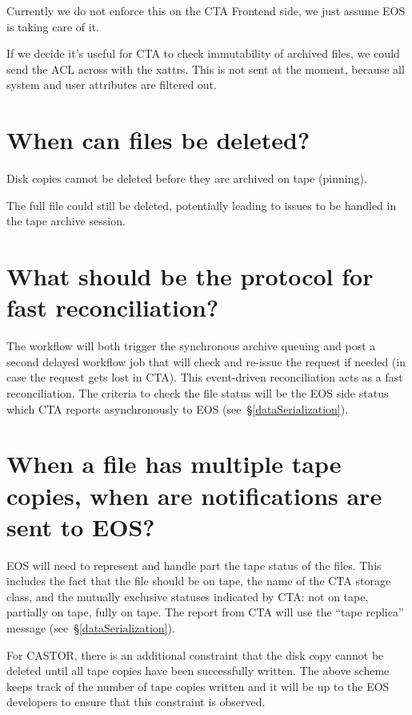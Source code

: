 Currently we do not enforce this on the CTA Frontend side, we just assume EOS is taking care of it.

If we decide it's useful for CTA to check immutability of archived files, we could send the ACL across with the xattrs.
This is not sent at the moment, because all system and user attributes are filtered out.

\section{When can files be deleted?}

Disk copies cannot be deleted before they are archived on tape (pinning).

The full file could still be deleted, potentially leading to issues to be handled in the tape archive session.

\section{What should be the protocol for fast reconciliation?}

The workflow will both trigger the synchronous archive queuing and post a second delayed workflow job that will
check and re-issue the request if needed (in case the request gets lost in CTA). This event-driven reconciliation acts
as a fast reconciliation. The criteria to check the file status will be the EOS side status which CTA reports
asynchronously to EOS (see~\S\ref{dataSerialization}).

\section{When a file has multiple tape copies, when are notifications are sent to EOS?}

EOS will need to represent and handle part the tape status of the files. This includes the fact that the file should be
on tape, the name of the CTA storage class, and the mutually exclusive statuses indicated by CTA: not on tape, partially
on tape, fully on tape.	The report from CTA will use the ``tape replica'' message (see~\S\ref{dataSerialization}).

For CASTOR, there is an additional constraint that the disk copy cannot be deleted until all tape copies have been
successfully written. The above scheme keeps track of the number of tape copies written and it will be up to the
EOS developers to ensure that this constraint is observed.

